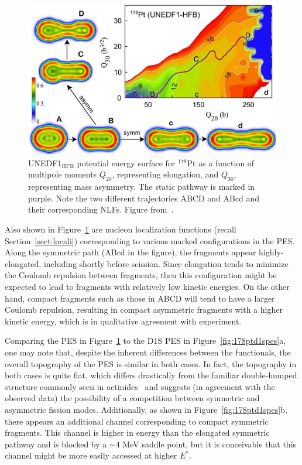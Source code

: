 \begin{figure}
	\centering
	\includegraphics[width=0.7\linewidth]{TeX_files/178Pt_unedf1_pes.jpg}
	\caption{UNEDF1$_\mathrm{HFB}$ potential energy surface for $^{178}$Pt as a function of multipole moments $Q_{20}$, representing elongation, and $Q_{30}$, representing mass asymmetry. The static pathway is marked in purple. Note the two different trajectories ABCD and ABcd and their corresponding NLFs. Figure from~\cite{Tsekhanovich2019}.}
	\label{fig:178ptunedf1pes}
\end{figure}

Also shown in Figure~\ref{fig:178ptunedf1pes} are nucleon localization functions (recall Section~\ref{sect:locali}) corresponding to various marked configurations in the PES. Along the symmetric path (ABcd in the figure), the fragments appear highly-elongated, including shortly before scission. Since elongation tends to minimize the Coulomb repulsion between fragments, then this configuration might be expected to lead to fragments with relatively low kinetic energies. On the other hand, compact fragments such as those in ABCD will tend to have a larger Coulomb repulsion, resulting in compact asymmetric fragments with a higher kinetic energy, which is in qualitative agreement with experiment.

Comparing the {\hfb} PES in Figure~\ref{fig:178ptunedf1pes} to the D1S PES in Figure~\ref{fig:178ptd1spes}a, one may note that, despite the inherent differences between the functionals, the overall topography of the PES is similar in both cases. In fact, the topography in both cases is quite flat, which differs drastically from the familiar double-humped structure commonly seen in actinides~\cite{bjørnholm1980a} and suggests (in agreement with the observed data) the possibility of a competition between symmetric and asymmetric fission modes. Additionally, as shown in Figure~\ref{fig:178ptd1spes}b, there appears an additional channel corresponding to compact symmetric fragments. This channel is higher in energy than the elongated symmetric pathway and is blocked by a ${\sim}4$ MeV saddle point, but it is conceivable that this channel might be more easily accessed at higher $E^*$. %

